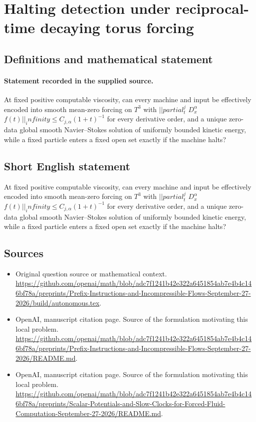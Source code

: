 \documentclass[11pt]{article}
\begin{document}
\section*{Halting detection under reciprocal-time decaying torus forcing}\label{statement}
\subsection{Definitions and mathematical statement}
\paragraph{Statement recorded in the supplied source.}
At fixed positive computable viscosity, can every machine and input be effectively encoded into smooth mean-zero forcing on $T^3$ with $||partial_t^j$ $D_x^\alpha $ $f(t)||_infinity\leq C_{j,\alpha }(1+t)^{-1}$ for every derivative order, and a unique zero-data global smooth Navier–Stokes solution of uniformly bounded kinetic energy, while a fixed particle enters a fixed open set exactly if the machine halts?
\subsection{Short English statement}
At fixed positive computable viscosity, can every machine and input be effectively encoded into smooth mean-zero forcing on $T^3$ with $||partial_t^j$ $D_x^\alpha $ $f(t)||_infinity\leq C_{j,\alpha }(1+t)^{-1}$ for every derivative order, and a unique zero-data global smooth Navier–Stokes solution of uniformly bounded kinetic energy, while a fixed particle enters a fixed open set exactly if the machine halts?
\subsection{Sources}
\begin{itemize}
\item[S1] Original question source or mathematical context.
\url{https://github.com/openai/math/blob/adc7f1241b42e322a6451854ab7e4b4c146bf78a/preprints/Prefix-Instructions-and-Incompressible-Flows-September-27-2026/build/autonomous.tex}.
\item[S2] OpenAI, manuscript citation page. Source of the formulation motivating this local problem.
\url{https://github.com/openai/math/blob/adc7f1241b42e322a6451854ab7e4b4c146bf78a/preprints/Prefix-Instructions-and-Incompressible-Flows-September-27-2026/README.md}.
\item[S3] OpenAI, manuscript citation page. Source of the formulation motivating this local problem.
\url{https://github.com/openai/math/blob/adc7f1241b42e322a6451854ab7e4b4c146bf78a/preprints/Scalar-Potentials-and-Slow-Clocks-for-Forced-Fluid-Computation-September-27-2026/README.md}.
\end{itemize}
\end{document}
